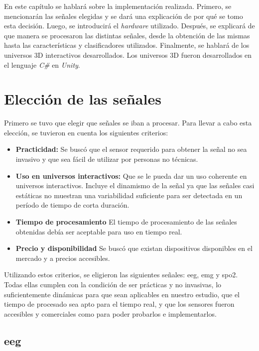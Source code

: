 En este capítulo se hablará sobre la implementación realizada. Primero, se mencionarán las señales elegidas y se dará una explicación de por qué se tomo esta decisión. Luego, se introducirá el \emph{hardware} utilizado. Después, se explicará de que manera se procesaron las distintas señales, desde la obtención de las mismas hasta las características y clasificadores utilizados. Finalmente, se hablará de los universos 3D interactivos desarrollados. Los universos 3D fueron desarrollados en el lenguaje \emph{C\#} en \emph{Unity}.

\section{Elección de las señales}

Primero se tuvo que elegir que señales se iban a procesar. Para llevar a cabo esta elección, se tuvieron en cuenta los siguientes criterios:

\begin{itemize}
\item \textbf{Practicidad:} Se buscó que el sensor requerido para obtener la señal no sea invasivo y que sea fácil de utilizar por personas no técnicas.
\item \textbf{Uso en universos interactivos:} Que se le pueda dar un uso coherente en universos interactivos. Incluye el dinamismo de la señal ya que las señales casi estáticas no muestran una variabilidad suficiente para ser detectada en un período de tiempo de corta duración.
\item \textbf{Tiempo de procesamiento} El tiempo de procesamiento de las señales obtenidas debía ser aceptable para uso en tiempo real.
\item \textbf{Precio y disponibilidad} Se buscó que existan dispositivos disponibles en el mercado y a precios accesibles.
\end{itemize}

Utilizando estos criterios, se eligieron las siguientes señales: \acrshort{eeg}, \acrshort{emg} y \acrshort{spo2}. Todas ellas cumplen con la condición de ser prácticas y no invasivas, lo suficientemente dinámicas para que sean aplicables en nuestro estudio, que el tiempo de procesado sea apto para el tiempo real, y que los sensores fueron accesibles y comerciales como para poder probarlos e implementarlos.

\subsection{\acrshort{eeg}}

